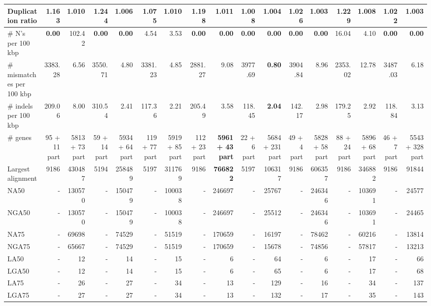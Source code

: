\documentclass[12pt,a4paper]{article}
\begin{document}
\begin{table}[ht]
\begin{center}
\begin{tabular}{|l*{16}{|r}|}
Duplication ratio & 1.163 & 1.010 & 1.244 & 1.006 & 1.075 & 1.010 & 1.198 & 1.011 & 1.008 & 1.004 & 1.026 & {\bf 1.003} & 1.229 & 1.008 & 1.022 & {\bf 1.003} \\ \hline
\# N's per 100 kbp & {\bf 0.00} & 102.42 & {\bf 0.00} & {\bf 0.00} & 4.54 & 3.53 & {\bf 0.00} & {\bf 0.00} & {\bf 0.00} & {\bf 0.00} & {\bf 0.00} & {\bf 0.00} & 16.04 & 4.10 & {\bf 0.00} & {\bf 0.00} \\ \hline
\# mismatches per 100 kbp & 3383.28 & 6.56 & 3550.71 & 4.80 & 3381.23 & 4.85 & 2881.27 & 9.08 & 3977.69 & {\bf 0.80} & 3904.84 & 8.96 & 2353.02 & 12.78 & 3487.03 & 6.18 \\ \hline
\# indels per 100 kbp & 209.06 & 8.00 & 310.54 & 2.41 & 117.36 & 2.21 & 205.49 & 3.58 & 118.45 & {\bf 2.04} & 142.17 & 2.98 & 179.25 & 2.92 & 118.84 & 3.13 \\ \hline
\# genes & 95 + 11 part & 5813 + 73 part & 59 + 14 part & 5934 + 64 part & 119 + 77 part & 5919 + 85 part & 112 + 23 part & {\bf 5961 + 43 part} & 22 + 6 part & 5684 + 231 part & 49 + 4 part & 5828 + 58 part & 88 + 24 part & 5896 + 68 part & 46 + 7 part & 5543 + 328 part \\ \hline
Largest alignment & 9186 & 430487 & 5194 & 258489 & 5197 & 311769 & 9186 & {\bf 766822} & 5197 & 106317 & 9186 & 606357 & 9186 & 346882 & 9186 & 91844 \\ \hline
NA50 & - & 130570 & - & 150479 & - & 100038 & - & 246697 & - & 25767 & - & 246346 & - & 103691 & - & 24577 \\ \hline
NGA50 & - & 130570 & - & 150479 & - & 100038 & - & 246697 & - & 25512 & - & 246346 & - & 103691 & - & 24465 \\ \hline
NA75 & - & 69698 & - & 74529 & - & 51519 & - & 170659 & - & 16197 & - & 78462 & - & 60216 & - & 13814 \\ \hline
NGA75 & - & 65667 & - & 74529 & - & 51519 & - & 170659 & - & 15678 & - & 74856 & - & 57817 & - & 13213 \\ \hline
LA50 & - & 12 & - & 14 & - & 15 & - & 6 & - & 64 & - & 6 & - & 17 & - & 66 \\ \hline
LGA50 & - & 12 & - & 14 & - & 15 & - & 6 & - & 65 & - & 6 & - & 17 & - & 68 \\ \hline
LA75 & - & 26 & - & 27 & - & 34 & - & 13 & - & 129 & - & 16 & - & 34 & - & 137 \\ \hline
LGA75 & - & 27 & - & 27 & - & 34 & - & 13 & - & 132 & - & 17 & - & 35 & - & 143 \\ \hline
\end{tabular}
\end{center}
\end{table}
\end{document}
